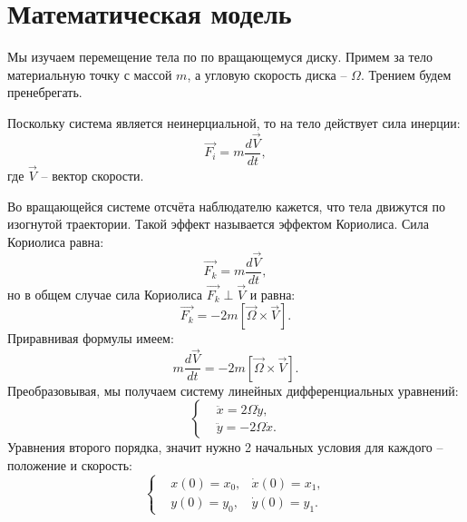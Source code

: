 \section{Математическая модель}
    Мы изучаем перемещение тела по по вращающемуся диску. Примем за тело материальную точку с массой \( m \), а угловую скорость диска -- \( \Omega \). Трением будем пренебрегать.

    Поскольку система является неинерциальной, то на тело действует сила инерции:
    \[
        \overrightarrow{F_i} = m \frac{d \overrightarrow{V}}{dt},
    \]
    где \( \overrightarrow{V} \) -- вектор скорости.

    Во вращающейся системе отсчёта наблюдателю кажется, что тела движутся по изогнутой траектории. Такой эффект называется эффектом Кориолиса. Сила Кориолиса равна:
    \[
        \overrightarrow{F_k} = m \frac{d \overrightarrow{V}}{dt},
    \]
    но в общем случае сила Кориолиса \( \overrightarrow{F_k} \perp \overrightarrow{V} \) и равна:
    \[
        \overrightarrow{F_k} = - 2 m \left[ \overrightarrow{\Omega} \times \overrightarrow{V} \right].
    \]
    Приравнивая формулы имеем:
    \[
        m \frac{d \overrightarrow{V}}{dt} = - 2 m \left[ \overrightarrow{\Omega} \times \overrightarrow{V} \right].
    \]
    Преобразовывая, мы получаем систему линейных дифференциальных уравнений:
    \[
        \left\{ \begin{split}
            & \ddot{x} = 2 \Omega \dot{y}, \\
            & \ddot{y} = -2\Omega \dot{x}.
        \end{split} \right.
    \]
    Уравнения второго порядка, значит нужно 2 начальных условия для каждого -- положение и скорость:
    \[
        \left\{\begin{split}
            & x(0) = x_0, & \dot{x}(0) = x_1, \\
            & y(0) = y_0, & \dot{y}(0) = y_1.
        \end{split}\right.
    \]